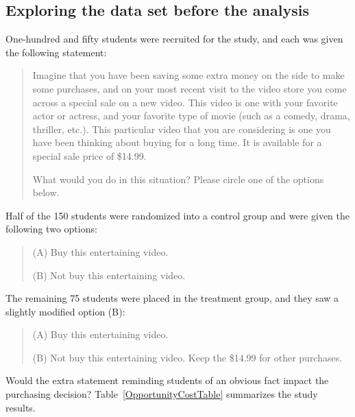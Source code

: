 \subsection{Exploring the data set before the analysis}

One-hundred and fifty students were recruited for the study, and each was given the following statement:
\begin{quote}
Imagine that you have been saving some extra money on the side to make some purchases, and on your most recent visit to the video store you come across a special sale on a new video. This video is one with your favorite actor or actress, and your favorite type of movie (such as a comedy, drama, thriller, etc.). This particular video that you are considering is one you have been thinking about buying for a long time. It is available for a special sale price of \$14.99.

What would you do in this situation? Please circle one of the options below.
\end{quote}
Half of the 150 students were randomized into a control group and were given the following two options:
\begin{quote}
(A) Buy this entertaining video.

(B) Not buy this entertaining video.
\end{quote}
The remaining 75 students were placed in the treatment group, and they saw a slightly modified option (B):
\begin{quote}
(A) Buy this entertaining video.

(B) Not buy this entertaining video. Keep the \$14.99 for other purchases.
\end{quote}
Would the extra statement reminding students of an obvious fact impact the purchasing decision? Table~\ref{OpportunityCostTable} summarizes the study results.

